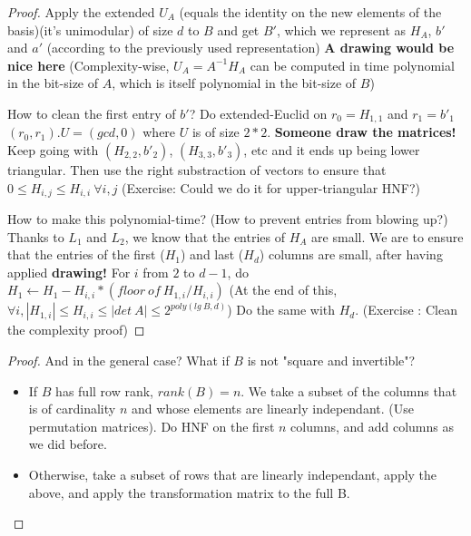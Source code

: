 \documentclass[a4paper,10pt]{article}
\begin{document}
\begin{proof}
Apply the extended $U_A$ (equals the identity on the new elements of the basis)(it's unimodular) of size $d$ to $B$ and get $B'$, which we represent as $H_A$, $b'$ and $a'$ (according to the previously used representation) \textbf{A drawing would be nice here}
(Complexity-wise, $U_A = A^{-1} H_A$ can be computed in time polynomial in the bit-size of $A$, which is itself polynomial in the bit-size of $B$) \newline

How to clean the first entry of $b'$?
Do extended-Euclid on $r_0 = H_{1,1}$ and $r_1 = b'_1$
$(r_0,r_1).U = (gcd,0)$ where $U$ is of size $2*2$. 
\textbf{Someone draw the matrices!}
Keep going with $(H_{2,2},b'_2)$, $(H_{3,3},b'_3)$, etc and it ends up being lower triangular.
Then use the right substraction of vectors to ensure that $0 \leq H_{i,j} \leq H_{i,i} \ \forall i, j$
(Exercise: Could we do it for upper-triangular HNF?) \newline

How to make this polynomial-time? (How to prevent entries from blowing up?)
Thanks to $L_1$ and $L_2$, we know that the entries of $H_A$ are small.
We are to ensure that the entries of the first ($H_1$) and last ($H_d$) columns are small, after having applied \textbf{drawing!}
For $i$ from $2$ to $d-1$, do
$H_1 \leftarrow H_1 - H_{i,i}*(floor \ of \ H_{1,i}/H_{i,i})$ 
(At the end of this, $\forall i, |H_{1,i}| \leq H_{i,i} \leq |det \ A| \leq 2^{poly(lg \ B, d)}$)
Do the same with $H_d$.
(Exercise : Clean the complexity proof)
\end{proof}

\begin{proof}
And in the general case? What if $B$ is not "square and invertible"?

\begin{itemize}
\item If $B$ has full row rank, $rank(B)=n$. We take a subset of the columns that is of cardinality $n$ and whose elements are linearly independant. (Use permutation matrices). Do HNF on the first $n$ columns, and add columns as we did before.
\item Otherwise, take a subset of rows that are linearly independant, apply the above, and apply the transformation matrix to the full B. 
\end{itemize}
\end{proof}
\end{document}
